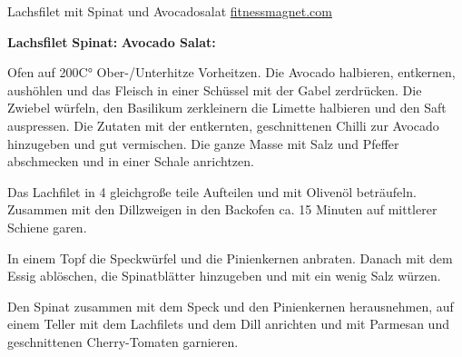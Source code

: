 \begin{recipe}[]{ Lachsfilet mit Spinat und Avocadosalat }{ \href{www.fitnessmagnet.com/Rezepte/tabid/80/Fitness/View/Fitnessartikel/1637/Lachsfilet-an-einem-Avocado-Dip-mit-frischem-Spinat.aspx}{fitnessmagnet.com} }{  }


\ingredient{}
\textbf{Lachsfilet}
\ingredient{}
\textbf{Spinat:}
\ingredient{}
\textbf{Avocado Salat:}
\ingredient{}

\step
Ofen auf 200C° Ober-/Unterhitze Vorheitzen. Die Avocado halbieren, entkernen, aushöhlen und 
das Fleisch in einer Schüssel mit der Gabel zerdrücken. 
Die Zwiebel würfeln, den Basilikum zerkleinern die Limette halbieren und den Saft auspressen. 
Die Zutaten mit der entkernten, geschnittenen Chilli zur Avocado hinzugeben und gut vermischen.
Die ganze Masse mit Salz und Pfeffer abschmecken und in einer Schale anrichtzen.

\step
Das Lachfilet in 4 gleichgroße teile Aufteilen und mit Olivenöl beträufeln. 
Zusammen mit den Dillzweigen in den Backofen ca. 15 Minuten auf mittlerer Schiene garen.


\step
In einem Topf die Speckwürfel und die Pinienkernen anbraten. Danach mit dem Essig ablöschen, die Spinatblätter hinzugeben und mit ein wenig Salz würzen.

\step
Den Spinat zusammen mit dem Speck und den Pinienkernen herausnehmen, auf einem Teller mit dem Lachfilets
und dem Dill anrichten und mit Parmesan und geschnittenen Cherry-Tomaten garnieren.


\end{recipe}
